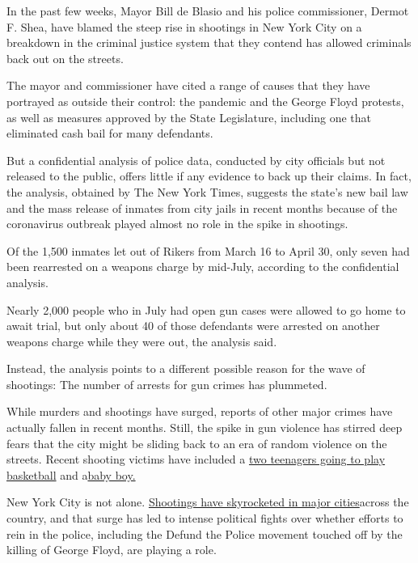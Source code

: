 In the past few weeks, Mayor Bill de Blasio and his police commissioner,
Dermot F. Shea, have blamed the steep rise in shootings in New York City
on a breakdown in the criminal justice system that they contend has
allowed criminals back out on the streets.

The mayor and commissioner have cited a range of causes that they have
portrayed as outside their control: the pandemic and the George Floyd
protests, as well as measures approved by the State Legislature,
including one that eliminated cash bail for many defendants.

But a confidential analysis of police data, conducted by city officials
but not released to the public, offers little if any evidence to back up
their claims. In fact, the analysis, obtained by The New York Times,
suggests the state's new bail law and the mass release of inmates from
city jails in recent months because of the coronavirus outbreak played
almost no role in the spike in shootings.

Of the 1,500 inmates let out of Rikers from March 16 to April 30, only
seven had been rearrested on a weapons charge by mid-July, according to
the confidential analysis.

Nearly 2,000 people who in July had open gun cases were allowed to go
home to await trial, but only about 40 of those defendants were arrested
on another weapons charge while they were out, the analysis said.

Instead, the analysis points to a different possible reason for the wave
of shootings: The number of arrests for gun crimes has plummeted.

While murders and shootings have surged, reports of other major crimes
have actually fallen in recent months. Still, the spike in gun violence
has stirred deep fears that the city might be sliding back to an era of
random violence on the streets. Recent shooting victims have included a
\href{https://www.nytimes.com/2020/07/27/nyregion/nyc-shootings-weekend.html?searchResultPosition=1}{two
teenagers going to play basketball} and
a\href{https://www.nytimes.com/2020/07/13/nyregion/Davell-Gardner-brooklyn-shooting.html?searchResultPosition=9}{baby
boy.}

New York City is not alone.
\href{https://www.nytimes.com/2020/07/05/us/chicago-shootings.html?searchResultPosition=6}{Shootings
have skyrocketed in major cities}across the country, and that surge has
led to intense political fights over whether efforts to rein in the
police, including the Defund the Police movement touched off by the
killing of George Floyd, are playing a role.

